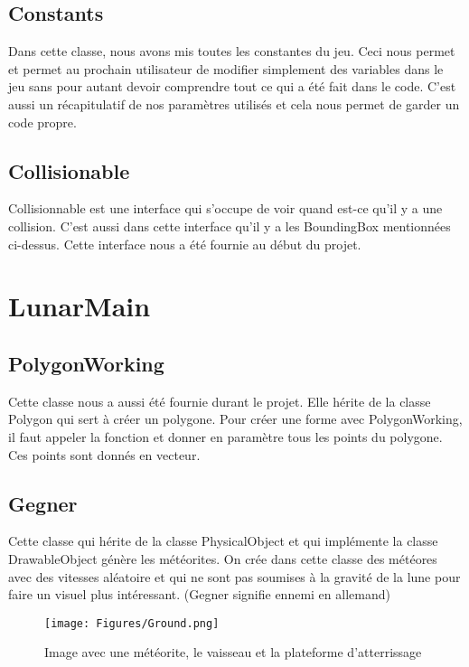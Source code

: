 \subsection{Constants}
Dans cette classe, nous avons mis toutes les constantes du jeu. Ceci nous permet et permet au prochain utilisateur de modifier simplement des variables dans le jeu sans pour autant devoir comprendre tout ce qui a été fait dans le code. C’est aussi un récapitulatif de nos paramètres utilisés et cela nous permet de garder un code propre.

\subsection{Collisionable}
Collisionnable est une interface qui s’occupe de voir quand est-ce qu’il y a une collision. C’est aussi dans cette interface qu’il y a les BoundingBox mentionnées ci-dessus. Cette interface nous a été fournie au début du projet.

\section{LunarMain}

\subsection{PolygonWorking}
Cette classe nous a aussi été fournie durant le projet. Elle hérite de la classe Polygon qui sert à créer un polygone. Pour créer une forme avec PolygonWorking, il faut appeler la fonction et donner en paramètre tous les points du polygone. Ces points sont donnés en vecteur.

\subsection{Gegner}
Cette classe qui hérite de la classe PhysicalObject et qui implémente la classe DrawableObject génère les météorites. On crée dans cette classe des météores avec des vitesses aléatoire et qui ne sont pas soumises à la gravité de la lune pour faire un visuel plus intéressant. (Gegner signifie ennemi en allemand)

\begin{figure}[h]
 \centering
 \texttt{[image: Figures/Ground.png]}
 \caption{Image avec une météorite, le vaisseau et la plateforme d'atterrissage}
 \label{figure:Ground}
\end{figure}

